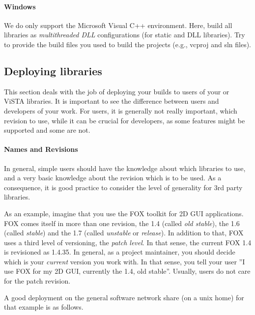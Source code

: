 \paragraph{Windows}
We do only support the Microsoft Visual C++ environment.
Here, build all libraries as \emph{multithreaded DLL} configurations (for static and DLL libraries).
Try to provide the build files you used to build the projects (e.g., vcproj and sln files).

\subsection{Deploying libraries}
This section deals with the job of deploying your builds to users of your or ViSTA libraries.
It is important to see the difference between users and developers of your work.
For users, it is generally not really important, which revision to use, while it can be crucial for developers, as some features might be supported and some are not.

\paragraph{Names and Revisions}
\label{dir_struct}
In general, simple users should have the knowledge about which libraries to use, and a very basic knowledge about the revision which is to be used.
As a consequence, it is good practice to consider the level of generality for 3rd party libraries.

As an example, imagine that you use the FOX toolkit for 2D GUI applications.
FOX comes itself in more than one revision, the 1.4 (called \textit{old stable}), the 1.6 (called \textit{stable}) and the 1.7 (called \textit{unstable} or \textit{release}).
In addition to that, FOX uses a third level of versioning, the \textit{patch level}.
In that sense, the current FOX 1.4 is revisioned as 1.4.35.
In general, as a project maintainer, you should decide which is your \textit{current} version you work with.
In that sense, you tell your user ''I use FOX for my 2D GUI, currently the 1.4, old stable''.
Usually, users do not care for the patch revision.

A good deployment on the general software network share (on a unix home) for that example is as follows.

